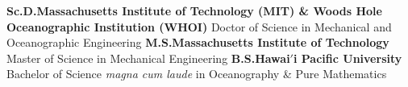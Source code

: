 %
%
%


\begin{scholarship}
					{\textbf{Sc.D.\hspace{4.75pt}Massachusetts Institute of Technology (MIT) \& Woods Hole Oceanographic Institution (WHOI)}}
	\scholarshipentry{}
					{Doctor of Science in Mechanical and Oceanographic Engineering}
					{\textbf{M.S.\hspace{7pt}Massachusetts Institute of Technology}}
        \scholarshipentry{}
					{Master of Science in Mechanical Engineering}
					{\textbf{B.S.\hspace{9.5pt}Hawai$'$i Pacific University}}
     \scholarshipentry{}
					{Bachelor of Science \emph{magna cum laude} in Oceanography \& Pure Mathematics}
\end{scholarship}